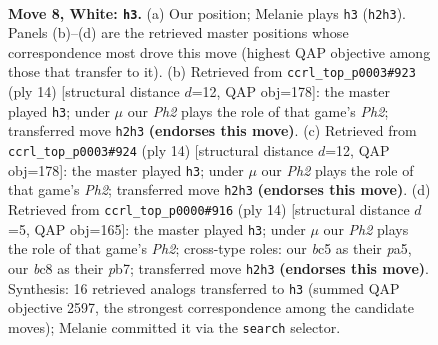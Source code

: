 \documentclass[11pt]{article}
\begin{document}
\begin{figure}[p]\centering
\begin{subfigure}{0.46\textwidth}\centering
\resizebox{\linewidth}{!}{%
\newchessgame
\chessboard[
  setfen={r1bq1rk1/ppp2pp1/2np1n2/2b1p2p/2B1P3/2PP1N2/PP3PPP/RNBQR1K1 w - - 0 8},
  showmover=false,
  pgfstyle=straightmove, color=movearrow, markmove={h2-h3}
]}
\caption{}
\end{subfigure}\hfill
\begin{subfigure}{0.46\textwidth}\centering
\resizebox{\linewidth}{!}{%
\newchessgame
\chessboard[
  setfen={r1bq1rk1/1pp2ppp/p1np1n2/2b1p3/2B1P3/2PP1N2/PP3PPP/RNBQR1K1 w - - 2 8},
  showmover=false,
  pgfstyle=straightmove, color=movearrow, markmove={h2-h3}
]}
\caption{}
\end{subfigure}
\\[4pt]
\begin{subfigure}{0.46\textwidth}\centering
\resizebox{\linewidth}{!}{%
\newchessgame
\chessboard[
  setfen={r1bq1rk1/1pp2ppp/p1np1n2/2b1p3/2B1P3/2PP1N2/PP3PPP/RNBQR1K1 w - - 2 8},
  showmover=false,
  pgfstyle=straightmove, color=movearrow, markmove={h2-h3}
]}
\caption{}
\end{subfigure}\hfill
\begin{subfigure}{0.46\textwidth}\centering
\resizebox{\linewidth}{!}{%
\newchessgame
\chessboard[
  setfen={r1bq1rk1/1pp2ppp/2np1n2/p1b1p3/2B1P3/2PP1N2/PP3PPP/RNBQR1K1 w - - 0 8},
  showmover=false,
  pgfstyle=straightmove, color=movearrow, markmove={h2-h3}
]}
\caption{}
\end{subfigure}
\caption{\textbf{Move 8, White: \texttt{h3}.} (a) Our position; Melanie plays \texttt{h3} (\texttt{h2h3}). Panels (b)--(d) are the retrieved master positions whose correspondence most drove this move (highest QAP objective among those that transfer to it). (b) Retrieved from \texttt{ccrl\_top\_p0003\#923} (ply 14) [structural distance $d$=12, QAP obj=178]: the master played \texttt{h3}; under $\mu$ our \emph{Ph2} plays the role of that game's \emph{Ph2}; transferred move \texttt{h2h3} \textbf{(endorses this move)}. (c) Retrieved from \texttt{ccrl\_top\_p0003\#924} (ply 14) [structural distance $d$=12, QAP obj=178]: the master played \texttt{h3}; under $\mu$ our \emph{Ph2} plays the role of that game's \emph{Ph2}; transferred move \texttt{h2h3} \textbf{(endorses this move)}. (d) Retrieved from \texttt{ccrl\_top\_p0000\#916} (ply 14) [structural distance $d$=5, QAP obj=165]: the master played \texttt{h3}; under $\mu$ our \emph{Ph2} plays the role of that game's \emph{Ph2}; cross-type roles: our \emph{b}c5 as their \emph{p}a5, our \emph{b}c8 as their \emph{p}b7; transferred move \texttt{h2h3} \textbf{(endorses this move)}. Synthesis: 16 retrieved analogs transferred to \texttt{h3} (summed QAP objective 2597, the strongest correspondence among the candidate moves); Melanie committed it via the \texttt{search} selector.}
\label{fig:thought-m14}
\end{figure}
\end{document}
